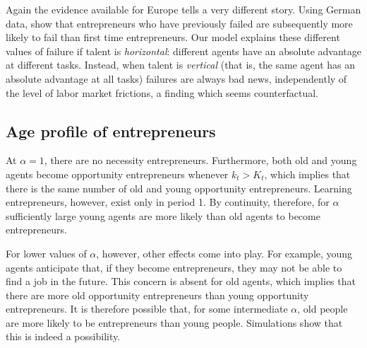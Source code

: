 \documentclass[12pt,american]{paper}
\theoremstyle{remark}
\begin{document}
Again the evidence available for Europe tells a very different story.  
Using German data, \citet*{gottshalkGreene2012} show that entrepreneurs who have previously failed are subsequently more likely to fail than first time entrepreneurs. %
Our model explains these different values of failure if talent is \emph{horizontal}: different agents have  
an absolute advantage at different tasks.  Instead, when talent is \emph{vertical} (that is, the same agent has an absolute advantage at all tasks) failures are always bad news, independently of the level of labor market frictions, a finding which seems counterfactual. 
\subsection{Age profile of entrepreneurs}
At $\alpha=1$, there are no necessity entrepreneurs. Furthermore, both old and young agents become opportunity entrepreneurs whenever $k_{t}>K_t$, which implies that there is the same number of old and young opportunity entrepreneurs. Learning entrepreneurs, however, exist only in period 1. By continuity, therefore, for $\alpha$ sufficiently large young agents are more likely than old agents to become entrepreneurs.


%
For lower values of $\alpha$, however,  other effects come into play. %
For example, young agents anticipate that, if they become entrepreneurs, they may not be able to find a job in the future. This concern is absent for old agents, which implies that there are more old opportunity entrepreneurs than young opportunity entrepreneurs. It is therefore possible that, for some intermediate $\alpha$, old people are more likely to be entrepreneurs than young people. Simulations show that this is indeed a possibility.
\end{document}

